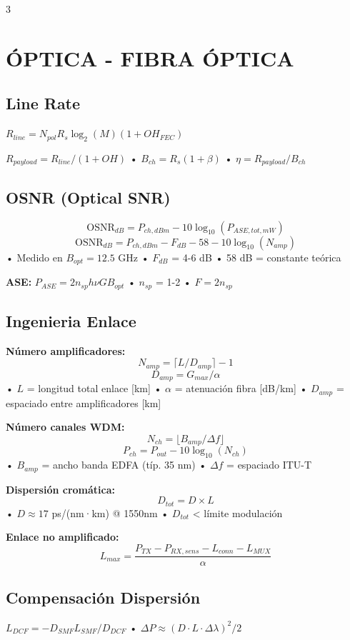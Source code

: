 \documentclass[a4paper,6pt]{extarticle}
\begin{document}
\begin{multicols}{3}
    \section*{ÓPTICA - FIBRA ÓPTICA}

    \subsection*{Line Rate}
    $\boxed{R_{line} = N_{pol} R_s \log_2(M) (1+OH_{FEC})}$
    
    $R_{payload} = R_{line}/(1+OH)$ • $B_{ch} = R_s(1+\beta)$ • $\eta = R_{payload}/B_{ch}$

\subsection*{OSNR (Optical SNR)}
$$\boxed{\text{OSNR}_{dB} = P_{ch,dBm} - 10\log_{10}(P_{ASE,tot,mW})}$$
$$\boxed{\text{OSNR}_{dB} = P_{ch,dBm} - F_{dB} - 58 - 10\log_{10}(N_{amp})}$$
• Medido en $B_{opt} = 12.5$ GHz • $F_{dB}$ = 4-6 dB • 58 dB = constante teórica

\textbf{ASE:} $P_{ASE} = 2n_{sp}h\nu GB_{opt}$ • $n_{sp}$ = 1-2 • $F = 2n_{sp}$

    \subsection*{Ingenieria Enlace}
    \textbf{Número amplificadores:}
    $$\boxed{N_{amp} = \lceil L/D_{amp}\rceil - 1}$$
    $$\boxed{D_{amp} = G_{max}/\alpha}$$
    • $L$ = longitud total enlace [km] • $\alpha$ = atenuación fibra [dB/km]
    • $D_{amp}$ = espaciado entre amplificadores [km]
    
    \textbf{Número canales WDM:}
    $$\boxed{N_{ch} = \lfloor B_{amp}/\Delta f\rfloor}$$
    $$\boxed{P_{ch} = P_{out} - 10\log_{10}(N_{ch})}$$
    • $B_{amp}$ = ancho banda EDFA (típ. 35 nm) • $\Delta f$ = espaciado ITU-T
    
    \textbf{Dispersión cromática:}
    $$\boxed{D_{tot} = D \times L}$$
    • $D \approx 17$ ps/(nm·km) @ 1550nm • $D_{tot}$ < límite modulación
    
    \textbf{Enlace no amplificado:}
    $$\boxed{L_{max} = \frac{P_{TX} - P_{RX,sens} - L_{conn} - L_{MUX}}{\alpha}}$$

    \subsection*{Compensación Dispersión}
    $\boxed{L_{DCF} = -D_{SMF} L_{SMF}/D_{DCF}}$ • $\Delta P \approx (D \cdot L \cdot \Delta\lambda)^2 / 2$


\end{multicols}
\end{document}
